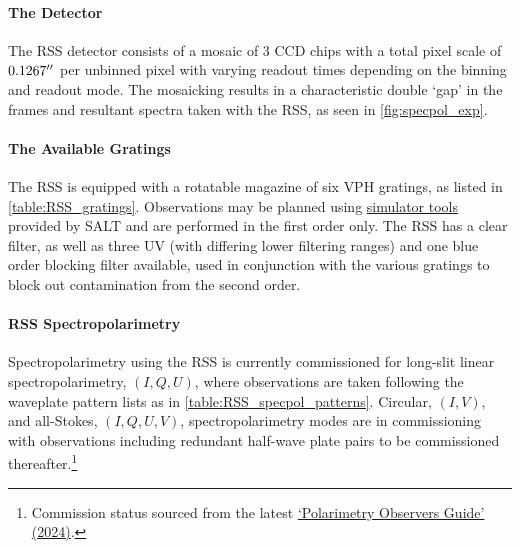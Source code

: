 \paragraph{The Detector}
The \gls{RSS} detector consists of a mosaic of 3 \gls{CCD} chips with a total pixel scale of $0.1267\hbox{$^{\prime\prime}$}$ per unbinned pixel with varying readout times depending on the binning and readout mode. The mosaicking results in a characteristic double `gap' in the frames and resultant spectra taken with the \gls{RSS}, as seen in \autoref{fig:specpol_exp}.

\paragraph{The Available Gratings}
The \gls{RSS} is equipped with a rotatable magazine of six \gls{VPH} gratings, as listed in \autoref{table:RSS_gratings}. Observations may be planned using \href{https://astronomers.salt.ac.za/software/}{simulator tools} provided by \gls{SALT} and are performed in the first order only. The \gls{RSS} has a clear filter, as well as three \gls{UV} (with differing lower filtering ranges) and one blue order blocking filter available, used in conjunction with the various gratings to block out contamination from the second order.



\paragraph{\gls{RSS} Spectropolarimetry} \label{sec:RSS_reductions}

Spectropolarimetry using the \gls{RSS} is currently commissioned for long-slit linear spectro\-polarimetry, $(I, Q, U)$, where observations are taken following the waveplate pattern lists as in \autoref{table:RSS_specpol_patterns}. Circular, $(I, V)$, and all-Stokes, $(I, Q, U, V)$, spectropolarimetry modes are in commissioning with observations including redundant half-wave plate pairs to be commissioned thereafter.\footnote{Commission status sourced from the latest \href{https://astronomers.salt.ac.za/wp-content/uploads/sites/71/2022/06/3170AM0013_Polarimetry_Observers_Guide_V1.2.pdf}{`Polarimetry Observers Guide' (2024)}.}


